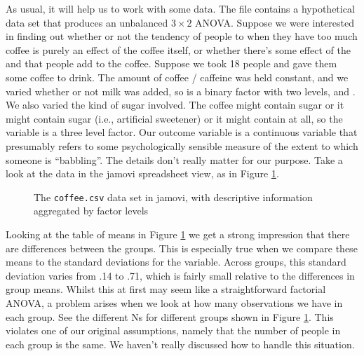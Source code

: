 As usual, it will help us to work with some data. The  file contains a hypothetical data set that produces an unbalanced $3 \times 2$ ANOVA. Suppose we were interested in finding out whether or not the tendency of people to  when they have too much coffee is purely an effect of the coffee itself, or whether there's some effect of the  and  that people add to the coffee. Suppose we took 18 people and gave them some coffee to drink. The amount of coffee / caffeine was held constant, and we varied whether or not milk was added, so  is a binary factor with two levels,  and . We also varied the kind of sugar involved. The coffee might contain  sugar or it might contain  sugar (i.e., artificial sweetener) or it might contain  at all, so the  variable is a three level factor. Our outcome variable is a continuous variable that presumably refers to some psychologically sensible measure of the extent to which someone is ``babbling''. The details don't really matter for our purpose. Take a look at the data in the jamovi spreadsheet view, as in Figure \ref{fig:factorialanova15}.

\vspace{0.5cm}
\begin{figure}[!htb]
\begin{center}
\caption{The \texttt{coffee.csv} data set in jamovi, with descriptive information aggregated by factor levels}
\label{fig:factorialanova15}
\HR
\end{center}
\end{figure}

Looking at the table of means in Figure \ref{fig:factorialanova15} we get a strong impression that there are differences between the groups. This is especially true when we compare these means to the standard deviations for the  variable. Across groups, this standard deviation varies from .14 to .71, which is fairly small relative to the differences in group means. Whilst this at first may seem like a straightforward factorial ANOVA, a problem arises when we look at how many observations we have in each group. See the different Ns for different groups shown in Figure \ref{fig:factorialanova15}. This violates one of our original assumptions, namely that the number of people in each group is the same. We haven't really discussed how to handle this situation.

